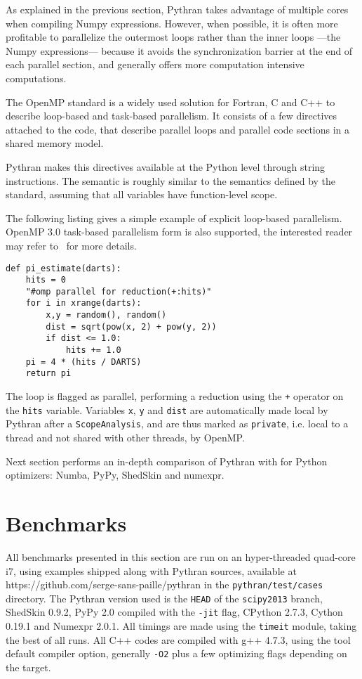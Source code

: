 \documentclass[10pt, onecolumn, preprint]{sigplanconf}
\begin{document}
As explained in the previous section, Pythran takes advantage of multiple cores
when compiling Numpy expressions. However, when possible, it is often more
profitable to parallelize the outermost loops rather than the inner loops
---the Numpy expressions--- because it avoids the synchronization barrier at
the end of each parallel section, and generally offers more computation
intensive computations.

The OpenMP standard\cite{openmp3.1} is a widely used solution for Fortran, C
and C++ to describe loop-based and task-based parallelism. It consists of a few
directives attached to the code, that describe parallel loops and parallel code
sections in a shared memory model.

Pythran makes this directives available at the Python level through string
instructions. The semantic is roughly similar to the semantics defined by the
standard, assuming that all variables have function-level scope.

The following listing gives a simple example of explicit loop-based 
parallelism. OpenMP 3.0 task-based parallelism form is also supported, the
interested reader may refer to~\cite{pyhpc2013} for more details.

\begin{lstlisting}
def pi_estimate(darts):
    hits = 0
    "#omp parallel for reduction(+:hits)"
    for i in xrange(darts):
        x,y = random(), random()
        dist = sqrt(pow(x, 2) + pow(y, 2))
        if dist <= 1.0:
            hits += 1.0
    pi = 4 * (hits / DARTS)
    return pi
\end{lstlisting}

The loop is flagged as parallel, performing a reduction using the \texttt{+}
operator on the \texttt{hits} variable. Variables \texttt{x}, \texttt{y} and
\texttt{dist} are automatically made local by Pythran after a
\texttt{ScopeAnalysis}, and are thus marked as \texttt{private}, i.e. local to
a thread and not shared with other threads, by OpenMP.

Next section performs an in-depth comparison of Pythran with for Python
optimizers: Numba, PyPy, ShedSkin and numexpr.


\section{Benchmarks}
\label{sec:benchmarks}


All benchmarks presented in this section are run on an hyper-threaded quad-core
i7, using examples shipped along with Pythran sources, available at
https://github.com/serge-sans-paille/pythran in the \texttt{pythran/test/cases}
directory. The Pythran version used is the \texttt{HEAD} of the \texttt{scipy2013} branch,
ShedSkin 0.9.2, PyPy 2.0 compiled with the \texttt{-jit} flag, CPython 2.7.3, Cython
0.19.1 and Numexpr 2.0.1. All timings are made using the \texttt{timeit} module,
taking the best of all runs. All C++ codes are compiled with g++ 4.7.3, using
the tool default compiler option, generally \texttt{-O2} plus a few optimizing flags
depending on the target.
\end{document}

